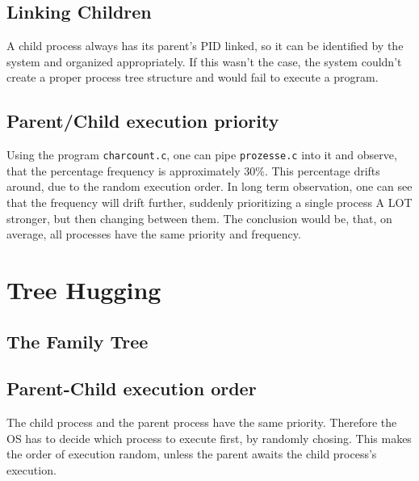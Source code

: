 \documentclass[a4paper, 11pt]{article}
\begin{document}
    \subsection{Linking Children}
    A child process always has its parent's PID linked, so it can be identified by the system and organized appropriately. 
    If this wasn't the case, the system couldn't create a proper process tree structure and would fail to execute a program. 

    \subsection{Parent/Child execution priority}
    Using the program \texttt{charcount.c}, one can pipe \texttt{prozesse.c} into it and observe, that the percentage frequency is approximately $30\%$.
    This percentage drifts around, due to the random execution order. In long term observation, one can see that the frequency will drift further, suddenly prioritizing
    a single process A LOT stronger, but then changing between them. The conclusion would be, that, on average, all processes have the same priority and frequency.
    \newpage
    
    \newpage

    \section{Tree Hugging}
    
    \subsection{The Family Tree}

    \subsection{Parent-Child execution order}
    The child process and the parent process have the same priority. Therefore the OS has to decide which process to execute first, by randomly chosing.
    This makes the order of execution random, unless the parent awaits the child process's execution. 
\end{document}
